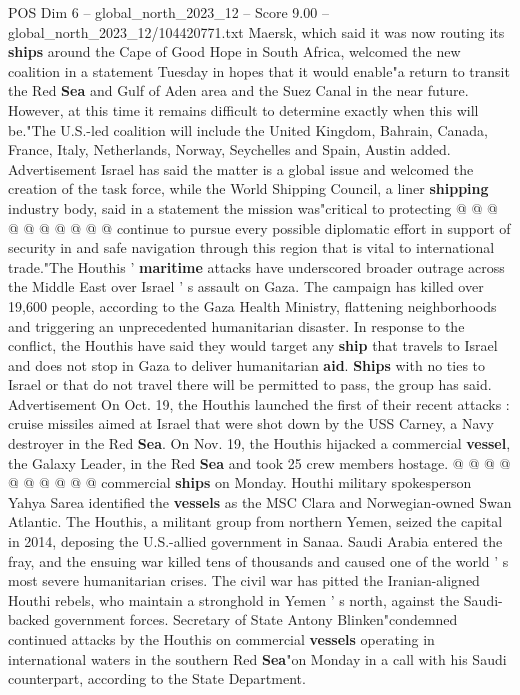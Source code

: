\begin{textsample}{POS Dim 6 – global\_north\_2023\_12 – Score 9.00 – global\_north\_2023\_12/104420771.txt}
Maersk, which said it was now routing its \textbf{ships} around the Cape of Good Hope in South Africa, welcomed the new coalition in a statement Tuesday in hopes that it would enable"a return to transit the Red \textbf{Sea} and Gulf of Aden area and the Suez Canal in the near future.
However, at this time it remains difficult to determine exactly when this will be."The U.S.-led coalition will include the United Kingdom, Bahrain, Canada, France, Italy, Netherlands, Norway, Seychelles and Spain, Austin added.
Advertisement Israel has said the matter is a global issue and welcomed the creation of the task force, while the World Shipping Council, a liner \textbf{shipping} industry body, said in a statement the mission was"critical to protecting @ @ @ @ @ @ @ @ @ @ continue to pursue every possible diplomatic effort in support of security in and safe navigation through this region that is vital to international trade."The Houthis ' \textbf{maritime} attacks have underscored broader outrage across the Middle East over Israel ' s assault on Gaza.
The campaign has killed over 19,600 people, according to the Gaza Health Ministry, flattening neighborhoods and triggering an unprecedented humanitarian disaster.
In response to the conflict, the Houthis have said they would target any \textbf{ship} that travels to Israel and does not stop in Gaza to deliver humanitarian \textbf{aid}. \textbf{Ships} with no ties to Israel or that do not travel there will be permitted to pass, the group has said.
Advertisement On Oct. 19, the Houthis launched the first of their recent attacks : cruise missiles aimed at Israel that were shot down by the USS Carney, a Navy destroyer in the Red \textbf{Sea}.
On Nov. 19, the Houthis hijacked a commercial \textbf{vessel}, the Galaxy Leader, in the Red \textbf{Sea} and took 25 crew members hostage. @ @ @ @ @ @ @ @ @ @ commercial \textbf{ships} on Monday.
Houthi military spokesperson Yahya Sarea identified the \textbf{vessels} as the MSC Clara and Norwegian-owned Swan Atlantic.
The Houthis, a militant group from northern Yemen, seized the capital in 2014, deposing the U.S.-allied government in Sanaa.
Saudi Arabia entered the fray, and the ensuing war killed tens of thousands and caused one of the world ' s most severe humanitarian crises.
The civil war has pitted the Iranian-aligned Houthi rebels, who maintain a stronghold in Yemen ' s north, against the Saudi-backed government forces.
Secretary of State Antony Blinken"condemned continued attacks by the Houthis on commercial \textbf{vessels} operating in international waters in the southern Red \textbf{Sea}"on Monday in a call with his Saudi counterpart, according to the State Department.

\end{textsample}
